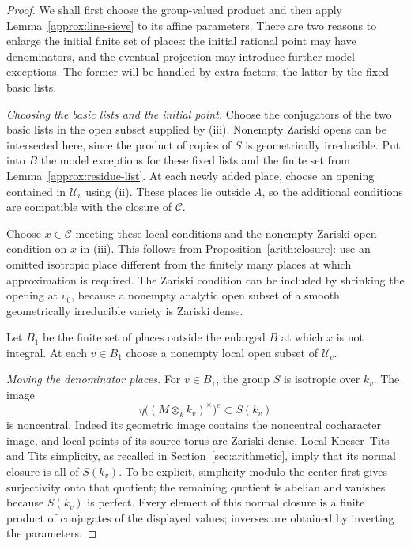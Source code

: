 \begin{proof}
We shall first choose the group-valued product and then apply
Lemma~\ref{approx:line-sieve} to its affine parameters.  There
are two reasons to enlarge the initial finite set of places:
the initial rational point may have denominators, and the
eventual projection may introduce further model exceptions.
The former will be handled by extra factors; the latter by
the fixed basic lists.

\emph{Choosing the basic lists and the initial point.}
Choose the conjugators of the two basic lists in the open
subset supplied by \textup{(iii)}.  Nonempty Zariski opens
can be intersected here, since the product of copies of $S$
is geometrically irreducible.  Put into $B$ the model
exceptions for these fixed lists and the finite set from
Lemma~\ref{approx:residue-list}.  At each newly added place,
choose an opening contained in $\mathcal U_v$ using
\textup{(ii)}.  These places lie outside $A$, so the
additional conditions are compatible with the closure
of $\mathcal C$.

Choose $x\in\mathcal C$ meeting these local conditions and
the nonempty Zariski open condition on $x$ in
\textup{(iii)}.  This follows from
Proposition~\ref{arith:closure}: use an omitted isotropic
place different from the finitely many places at which
approximation is required.  The Zariski condition can be
included by shrinking the opening at $v_0$, because a
nonempty analytic open subset of a smooth geometrically
irreducible variety is Zariski dense.

Let $B_1$ be the finite set of places outside the enlarged
$B$ at which $x$ is not integral.  At each $v\in B_1$ choose
a nonempty local open subset of $\mathcal U_v$.

\emph{Moving the denominator places.}
For $v\in B_1$, the group $S$ is isotropic over $k_v$.
The image
\[
 \eta\bigl((M\otimes_k k_v)^\times\bigr)^e
       \subset S(k_v)
\]
is noncentral.  Indeed its geometric image contains the
noncentral cocharacter image, and local points of its
source torus are Zariski dense.  Local Kneser--Tits and
Tits simplicity, as recalled in Section~\ref{sec:arithmetic},
imply that its normal closure is all of $S(k_v)$.
To be explicit, simplicity modulo the center first gives
surjectivity onto that quotient; the remaining quotient
is abelian and vanishes because $S(k_v)$ is perfect.
Every element of this normal closure is a finite product
of conjugates of the displayed values; inverses are
obtained by inverting the parameters.


\end{proof}
